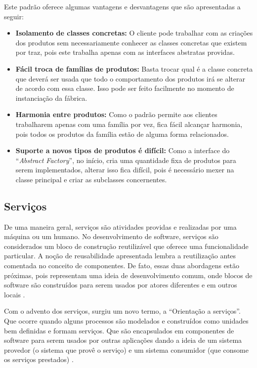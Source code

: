Este padrão oferece algumas vantagens e desvantagens que são apresentadas a seguir:

\begin{itemize}
	\item \textbf{Isolamento de classes concretas:} O cliente pode trabalhar com as criações dos produtos sem necessariamente conhecer as classes concretas que existem por traz, pois este trabalha apenas com as interfaces abstratas providas.
	\item \textbf{Fácil troca de famílias de produtos:} Basta trocar qual é a classe concreta que deverá ser usada que todo o comportamento dos produtos irá se alterar de acordo com essa classe. Isso pode ser feito facilmente no momento de instanciação da fábrica.
	\item \textbf{Harmonia entre produtos:} Como o padrão permite aos clientes trabalharem apenas com uma família por vez, fica fácil alcançar harmonia, pois todos os produtos da família estão de alguma forma relacionados.
	\item \textbf{Suporte a novos tipos de produtos é difícil:} Como a interface do ``\textit{Abstract Factory}'', no início, cria uma quantidade fixa de produtos para serem implementados, alterar isso fica difícil, pois é necessário mexer na classe principal e criar as subclasses concernentes.
\end{itemize}


\subsection{Serviços}

De uma maneira geral, serviços são atividades providas e realizadas por uma máquina ou um humano. No desenvolvimento de software, serviços são considerados um bloco de construção reutilizável que oferece uma funcionalidade particular. A noção de reusabilidade apresentada lembra a reutilização antes comentada no conceito de componentes. De fato, essas duas abordagens estão próximas, pois representam uma ideia de desenvolvimento comum, onde blocos de software são construídos para serem usados por atores diferentes e em outros locais \cite{Stojanovic:Dahanayake:2005}.

Com o advento dos serviços, surgiu um novo termo, a ``Orientação a serviços''. Que ocorre quando alguns processos são modelados e construídos como unidades bem definidas e formam serviços. Que são encapsulados em componentes de software para serem usados por outras aplicações dando a ideia de um sistema provedor (o sistema que provê o serviço) e um sistema consumidor (que consome os serviços prestados) \cite{Victorino:Brascher:2009}.

